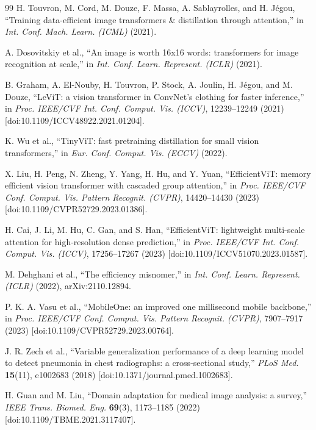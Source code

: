 \documentclass[12pt,letterpaper]{article}
\begin{document}
{\begin{thebibliography}{99}
H. Touvron, M. Cord, M. Douze, F. Massa, A. Sablayrolles, and H. J\'egou, ``Training data-efficient image transformers \& distillation through attention,'' in \textit{Int. Conf. Mach. Learn. (ICML)} (2021).

A. Dosovitskiy et al., ``An image is worth 16x16 words: transformers for image recognition at scale,'' in \textit{Int. Conf. Learn. Represent. (ICLR)} (2021).

B. Graham, A. El-Nouby, H. Touvron, P. Stock, A. Joulin, H. J\'egou, and M. Douze, ``LeViT: a vision transformer in ConvNet's clothing for faster inference,'' in \textit{Proc. IEEE/CVF Int. Conf. Comput. Vis. (ICCV)}, 12239--12249 (2021) [doi:10.1109/ICCV48922.2021.01204].

K. Wu et al., ``TinyViT: fast pretraining distillation for small vision transformers,'' in \textit{Eur. Conf. Comput. Vis. (ECCV)} (2022).

X. Liu, H. Peng, N. Zheng, Y. Yang, H. Hu, and Y. Yuan, ``EfficientViT: memory efficient vision transformer with cascaded group attention,'' in \textit{Proc. IEEE/CVF Conf. Comput. Vis. Pattern Recognit. (CVPR)}, 14420--14430 (2023) [doi:10.1109/CVPR52729.2023.01386].

H. Cai, J. Li, M. Hu, C. Gan, and S. Han, ``EfficientViT: lightweight multi-scale attention for high-resolution dense prediction,'' in \textit{Proc. IEEE/CVF Int. Conf. Comput. Vis. (ICCV)}, 17256--17267 (2023) [doi:10.1109/ICCV51070.2023.01587].

M. Dehghani et al., ``The efficiency misnomer,'' in \textit{Int. Conf. Learn. Represent. (ICLR)} (2022), arXiv:2110.12894.

P. K. A. Vasu et al., ``MobileOne: an improved one millisecond mobile backbone,'' in \textit{Proc. IEEE/CVF Conf. Comput. Vis. Pattern Recognit. (CVPR)}, 7907--7917 (2023) [doi:10.1109/CVPR52729.2023.00764].

J. R. Zech et al., ``Variable generalization performance of a deep learning model to detect pneumonia in chest radiographs: a cross-sectional study,'' \textit{PLoS Med.} \textbf{15}(11), e1002683 (2018) [doi:10.1371/journal.pmed.1002683].

H. Guan and M. Liu, ``Domain adaptation for medical image analysis: a survey,'' \textit{IEEE Trans. Biomed. Eng.} \textbf{69}(3), 1173--1185 (2022) [doi:10.1109/TBME.2021.3117407].


\end{thebibliography}}
\end{document}
